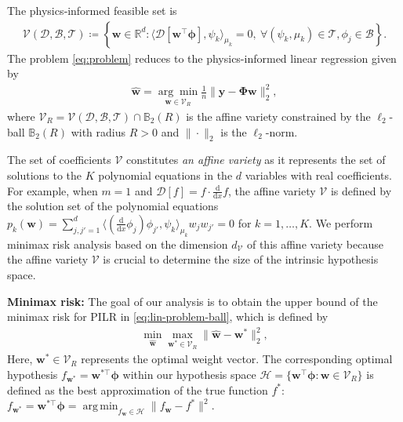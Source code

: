\documentclass{article}
\DeclareMathOperator*{\argmin}{arg\,min}
\theoremstyle{plain}
\theoremstyle{definition}
\theoremstyle{remark}
\begin{document}
The physics‐informed feasible set is
\begin{align}
\label{eq:def-V}
\mathcal{V}(\mathscr{D}, \mathcal{B}, \mathcal{T}) \coloneqq \left\{ \bm{w} \in \mathbb{R}^d: \langle \mathscr{D}\left[\bm{w}^{\top} \bm{\phi} \right], \psi_k \rangle_{\mu_k} = 0,\ \forall (\psi_k, \mu_k) \in \mathcal{T}, \phi_j \in \mathcal{B} \right\}.
\end{align}
The problem \cref{eq:problem} reduces to the physics-informed linear regression given by
\begin{gather}
\label{eq:lin-problem-ball}
\widehat{\boldsymbol{w}} = \underset{\boldsymbol{w} \in \mathcal{V}_R}{\arg \min } \frac{1}{n} \| \boldsymbol{y} - \mathbf{\Phi} \boldsymbol{w} \|_2^2,
\end{gather}
where $\mathcal{V}_R = \mathcal{V}(\mathscr{D}, \mathcal{B}, \mathcal{T}) \cap \mathbb{B}_2(R)$ is the affine variety constrained by the $\ell_2$-ball $\mathbb{B}_2(R)$ with radius $R > 0$ and \(\|\cdot\|_2\) is the \(\ell_2\)-norm.  

The set of coefficients \( \mathcal{V} \) constitutes \textit{an affine variety} as it represents the set of solutions to the \(K\) polynomial equations in the \( d \) variables with real coefficients. For example, when \( m = 1 \) and \( \mathscr{D}[f] = f \cdot \frac{\mathrm{d}}{\mathrm{d}x} f \), the affine variety \( \mathcal{V} \) is defined by the solution set of the polynomial equations \( p_k(\bm{w}) = \sum_{j, j'=1}^d \langle \left(\frac{\mathrm{d}}{\mathrm{d}x} \phi_j \right)\phi_{j'}, \psi_k \rangle_{\mu_k} w_j w_{j'} = 0 \) for \( k = 1, \ldots, K \). 
We perform minimax risk analysis based on the dimension \( d_{\mathcal{V}} \) of this affine variety because the affine variety \( \mathcal{V} \) is crucial to determine the size of the intrinsic hypothesis space.

\textbf{Minimax risk:} The goal of our analysis is to obtain the upper bound of the minimax risk for PILR in \cref{eq:lin-problem-ball}, which is defined by
\begin{gather}
    \label{eq:def-minmax-risk}
    \min_{\hat{\bm{w}}} \max_{\bm{w}^* \in \mathcal{V}_R} 
    \|\hat{\bm{w}} - \bm{w}^*\|_2^2,
\end{gather}
Here, $\bm{w}^* \in \mathcal{V}_R$ represents the optimal weight vector. The corresponding optimal hypothesis $f_{\bm{w}^*} = \bm{w}^{*\top} \bm{\phi}$ within our hypothesis space $\mathcal{H} = \{ \bm{w}^\top \bm{\phi} : \boldsymbol{w} \in \mathcal{V}_R \}$ is defined as the best approximation of the true function $f^*$: $f_{\bm{w}^*} = \bm{w}^{*\top} \bm{\phi} = \argmin_{f_{\bm{w}} \in \mathcal{H}} \|f_{\bm{w}} - f^*\|^2$.
\end{document}

